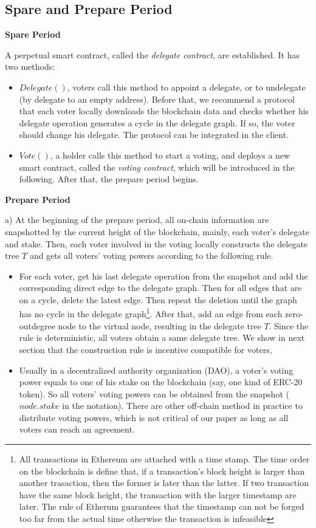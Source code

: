 \subsection{Spare and Prepare Period}
\textbf{Spare Period}

A perpetual smart contract, called the {\em delegate contract}, are established. It has two methods:
\begin{itemize}
	\item $Delegate()$, voters call this method to appoint a delegate, or to undelegate (by delegate to an empty address). Before that, we recommend a protocol that each voter locally downloads the blockchain data and checks whether his delegate operation generates a cycle in the delegate graph. If so, the voter should change his delegate. The protocol can be integrated in the client. 
	\item $Vote()$, a holder calls this method to start a voting, and deploys a new smart contract, called the {\em voting contract}, which will be introduced in the following. After that, the prepare period begins. 
\end{itemize}

\textbf{Prepare Period}

a) At the beginning of the prepare period, all on-chain information are snapshotted by the current height of the blockchain, mainly, each voter's delegate and stake. Then, each voter involved in the voting locally constructs the delegate tree $T$ and gets all voters' voting powers according to the following rule. 
\begin{itemize}
	\item For each voter, get his last delegate operation from the snapshot and add the corresponding direct edge to the delegate graph. Then for all edges that are on a cycle, delete the latest edge. Then repeat the deletion until the graph has no cycle in the delegate graph\footnote{All transactions in Ethereum are attached with a time stamp. The time order on the blockchain is define that, if a transaction's block height is larger than another trasaction, then the former is later than the latter. If two transaction have the same block height, the transaction with the larger timestamp are later. The rule of Etherum guarantees that the timestamp can not be forged too far from the actual time otherwise the transaction is infeasible}. After that, add an edge from each zero-outdegree node to the virtual node, resulting in the delegate tree $T$. Since the rule is deterministic, all voters obtain a same delegate tree. 
	We show in next section  that the construction rule is incentive compatible for voters, 
	\item  Usually in a decentralized authority organization (DAO), a voter's voting power equals to one of his stake on the blockchain (say, one kind of ERC-20 token). So all voters' voting powers can be obtained from the snapshot ($node.stake$ in the notation). There are other off-chain method in practice to distribute voting powers, which is not critical of our paper as long as all voters can reach an agreement.
\end{itemize}

